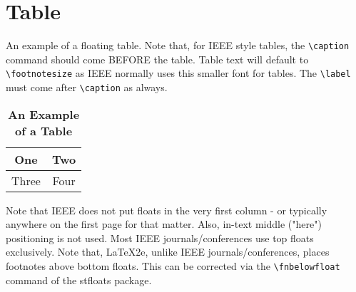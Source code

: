 \section{Table}
An example of a floating table. Note that, for IEEE style tables, the
\verb|\caption| command should come BEFORE the table. Table text will default to
\verb|\footnotesize| as IEEE normally uses this smaller font for tables.
The \verb|\label| must come after \verb|\caption| as always.

\begin{table}
\caption{\textbf{\label{tab:1} An Example of a Table}}
\begin{tabular}{cc}
\hline
One & Two\\
\hline
Three & Four\\
\hline
\end{tabular}
\end{table}


Note that IEEE does not put floats in the very first column - or typically
anywhere on the first page for that matter. Also, in-text middle ("here")
positioning is not used. Most IEEE journals/conferences use top floats
exclusively. Note that, LaTeX2e, unlike IEEE journals/conferences, places
footnotes above bottom floats. This can be corrected via the \verb|\fnbelowfloat|
command of the stfloats package.

